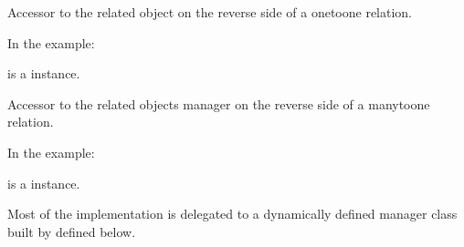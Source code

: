 \documentclass[letterpaper,10pt,french]{sphinxmanual}
\begin{document}
\begin{fulllineitems}
\begin{fulllineitems}
\label{\detokenize{main/model:main.models.Personnel.comptable}}
\pysigstartsignatures
{}
\pysigstopsignatures
\sphinxAtStartPar
Accessor to the related object on the reverse side of a one\sphinxhyphen{}to\sphinxhyphen{}one
relation.

\sphinxAtStartPar
In the example:

\begin{sphinxVerbatim}[commandchars=\\\{\}]
 
       
\end{sphinxVerbatim}

\sphinxAtStartPar
{} is a  instance.

\end{fulllineitems}


\begin{fulllineitems}
\label{\detokenize{main/model:main.models.Personnel.conge_set}}
\pysigstartsignatures
{}
\pysigstopsignatures
\sphinxAtStartPar
Accessor to the related objects manager on the reverse side of a
many\sphinxhyphen{}to\sphinxhyphen{}one relation.

\sphinxAtStartPar
In the example:

\begin{sphinxVerbatim}[commandchars=\\\{\}]
 
       
\end{sphinxVerbatim}

\sphinxAtStartPar
{} is a  instance.

\sphinxAtStartPar
Most of the implementation is delegated to a dynamically defined manager
class built by  defined below.


\end{fulllineitems}
\end{fulllineitems}
\end{document}
